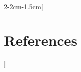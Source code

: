 \documentclass[notitlepage,openany,11pt]{report}
\theoremstyle{plain}%
\numberwithin{equation}{section}
\begin{document}

\clearpage
{} %

\let\oldthebibliography=\thebibliography
\let\endoldthebibliography=\endthebibliography
\renewenvironment{thebibliography}[1]{%
    \begin{oldthebibliography}{#1}%
    \setlength{\parskip}{3pt plus 2pt minus 1pt}%
    \setlength{\itemsep}{3pt}%
}%
{%
    \end{oldthebibliography}%
}

\begin{adjmulticols*}{2}{-2cm}{-1.5cm}[\section*{References}] %

\noindent
\footnotesize %
\begin{flushleft}


\end{flushleft}
\normalsize

\end{adjmulticols*}
\end{document}

